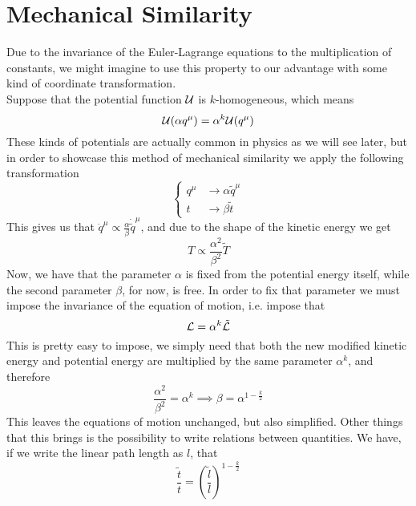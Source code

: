 \documentclass[../admech.tex]{subfiles}
\begin{document}
\section{Mechanical Similarity}
Due to the invariance of the Euler-Lagrange equations to the multiplication of constants, we might imagine to use this property to our advantage with some kind of coordinate transformation.\\
Suppose that the potential function $\mathcal{U}$ is $k$-homogeneous, which means
\begin{equation*}
	\mathcal{U}(\alpha q^\mu)=\alpha^k\mathcal{U}(q^\mu)
\end{equation*}
These kinds of potentials are actually common in physics as we will see later, but in order to showcase this method of mechanical similarity we apply the following transformation
\begin{equation}
	\left\{ \begin{aligned}
			q^\mu&\to\alpha\tilde{q}^\mu\\
			t&\to\beta\tilde{t}
	\end{aligned}\right.
	\label{eq:mechsimtrans}
\end{equation}
This gives us that $\dot{q}^\mu\propto\frac{\alpha}{\beta}\dot{\tilde{q}}^\mu$, and due to the shape of the kinetic energy we get
\begin{equation*}
	T\propto\frac{\alpha^2}{\beta^2}\tilde{T}
\end{equation*}
Now, we have that the parameter $\alpha$ is fixed from the potential energy itself, while the second parameter $\beta$, for now, is free. In order to fix that parameter we must impose the invariance of the equation of motion, i.e. impose that
\begin{equation*}
	\mathcal{L}=\alpha^k\tilde{\mathcal{L}}
\end{equation*}
This is pretty easy to impose, we simply need that both the new modified kinetic energy and potential energy are multiplied by the same parameter $\alpha^k$, and therefore
\begin{equation}
	\frac{\alpha^2}{\beta^2}=\alpha^k\implies\beta=\alpha^{1-\frac{k}{2}}
	\label{eq:betafixmechsim}
\end{equation}
This leaves the equations of motion unchanged, but also simplified. Other things that this brings is the possibility to write relations between quantities. We have, if we write the linear path length as $l$, that
\begin{equation}
	\frac{\tilde{t}}{t}=\left( \frac{\tilde{l}}{l} \right)^{1-\frac{k}{2}}
	\label{eq:mechsimrel}
\end{equation}
\end{document}
